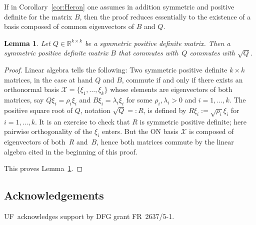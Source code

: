 \documentclass[pdftex]{sigma}
\numberwithin{equation}{section}
\newtheorem{Lemma}[Theorem]{Lemma}
\newcommand{\R}{{\mathbb{R}}}
\newcommand{\Xx}{{\mathcal{X}}}
\newcommand{\1}{{{\mathchoice {\rm 1\mskip-4mu l} {\rm 1\mskip-4mu l}
{\rm 1\mskip-4.5mu l} {\rm 1\mskip-5mu l}}}}
\begin{document}
If in Corollary~\ref{cor:Heron}
one assumes in addition symmetric and positive definite for the matrix
$B$, then the proof reduces essentially to the existence of a basis
composed of common eigenvectors of $B$ and $Q$.

\begin{Lemma}\label{le:commute-square}
Let $Q\in\R^{k\times k}$ be a symmetric positive definite matrix.
Then a symmetric positive definite matrix $B$ that commutes with~$Q$
commutes with $\sqrt{Q}$.
\end{Lemma}

\begin{proof}
Linear algebra tells the following:
Two symmetric positive definite $k\times k$ matrices, in the case at
hand $Q$ and $B$, commute if and only if there exists an orthonormal basis
$\Xx=\{\xi_1,\dots,\xi_k\}$ whose elements are eigenvectors of both
matrices, say $Q\xi_i=\rho_i\xi_i$ and $B\xi_i=\lambda_i\xi_i$ for
some $\rho_i,\lambda_i>0$ and $i=1,\dots,k$.
The positive square root of $Q$, notation $\sqrt{Q}=:R$, is defined
by $R\xi_i:=\sqrt{\rho_i}\xi_i$ for $i=1,\dots,k$.
It is an exercise to check that $R$ is symmetric positive definite;
here pairwise orthogonality of the $\xi_i$ enters.
But the ON basis $\Xx$ is composed of eigenvectors of both~$R$
and~$B$, hence both matrices commute by the linear algebra
cited in the beginning of this proof.

This proves Lemma~\ref{le:commute-square}.
\end{proof}

\subsection*{Acknowledgements}
UF~acknowledges support by DFG grant FR~2637/5-1.
\end{document}
